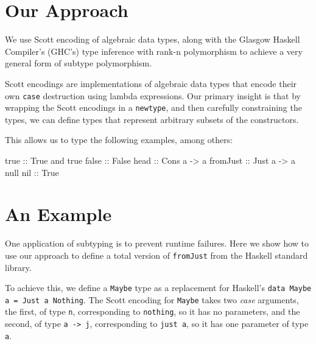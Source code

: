 \documentclass[]{article}
\newenvironment{Shaded}{}{}
\newcommand{\DataTypeTok}[1]{\textcolor[rgb]{0.56,0.13,0.00}{{#1}}}
\newcommand{\OtherTok}[1]{\textcolor[rgb]{0.00,0.44,0.13}{{#1}}}
\newcommand{\NormalTok}[1]{{#1}}
\begin{document}
\section{Our Approach}\label{our-approach}

We use Scott encoding of algebraic data types, along with the Glasgow
Haskell Compiler's (GHC's) type inference with rank-n polymorphism to
achieve a very general form of subtype polymorphism.

Scott encodings are implementations of algebraic data types that encode
their own \texttt{case} destruction using lambda expressions. Our
primary insight is that by wrapping the Scott encodings in a
\texttt{newtype}, and then carefully constraining the types, we can
define types that represent arbitrary subsets of the constructors.

This allows us to type the following examples, among others:

\begin{Shaded}
\begin{Highlighting}[]
\OtherTok{   true ::} \DataTypeTok{True}
   \NormalTok{and true}\OtherTok{ false ::} \DataTypeTok{False}
\OtherTok{   head ::} \DataTypeTok{Cons} \NormalTok{a }\OtherTok{->} \NormalTok{a}
\OtherTok{   fromJust ::} \DataTypeTok{Just} \NormalTok{a }\OtherTok{->} \NormalTok{a}
   \NormalTok{null}\OtherTok{ nil ::} \DataTypeTok{True}
\end{Highlighting}
\end{Shaded}

\section{An Example}\label{an-example}

One application of subtyping is to prevent runtime failures. Here we
show how to use our approach to define a total version of
\texttt{fromJust} from the Haskell standard library.

To achieve this, we define a \texttt{Maybe} type as a replacement for
Haskell's \texttt{data Maybe a = Just a \textbar{} Nothing}. The Scott
encoding for \texttt{Maybe} takes two \emph{case} arguments, the first,
of type \texttt{n}, corresponding to \texttt{nothing}, so it has no
parameters, and the second, of type \texttt{a -\textgreater{} j},
corresponding to \texttt{just a}, so it has one parameter of type
\texttt{a}.
\end{document}
